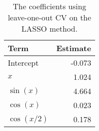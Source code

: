 \begin{table}[t]

\caption{\label{tab:lasso-coefs}The coefficients using leave-one-out \ac{CV} on the \ac{LASSO} method.}
\centering
\begin{tabular}{lr}
\toprule
Term & Estimate\\
\midrule
Intercept & -0.073\\
\(x\) & 1.024\\
\(\sin(x)\) & 4.664\\
\(\cos(x)\) & 0.023\\
\(\cos(x/2)\) & 0.178\\
\bottomrule
\end{tabular}
\end{table}